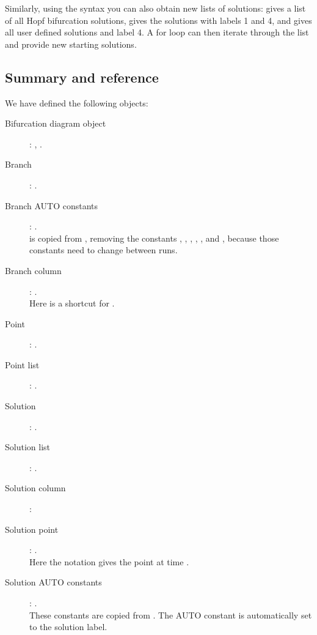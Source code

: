 \documentclass[12pt]{report}
\begin{document}
 Similarly, using the \commandf{()} syntax you can also obtain new lists of
 solutions:  gives a list of all Hopf bifurcation
 solutions,  gives the solutions with labels 1 and 4,
 and  gives all user defined solutions and
 label 4. A for loop can then iterate through the list and provide new
 starting solutions.

 \subsection{Summary and reference}
 We have defined the following objects:
 \begin{description}
   \item[Bifurcation diagram object]:
    , .
   \item[Branch]:
    .
   \item[Branch AUTO constants]:
    .\\
     is copied from , removing the
    constants , , , , , 
    and , because those constants need to change between runs.
   \item[Branch column]:
    .\\
    Here  is a shortcut for .
   \item[Point]:
    .
   \item[Point list]:
    .
   \item[Solution]:
    .
   \item[Solution list]:
    .
   \item[Solution column]:
   \item[Solution point]:
    .\\
    Here the  notation gives the point at
    time .
   \item[Solution AUTO constants]:
    .\\
    These constants are copied from . The AUTO constant
     is automatically set to the solution label.
 \end{description}
\end{document}

